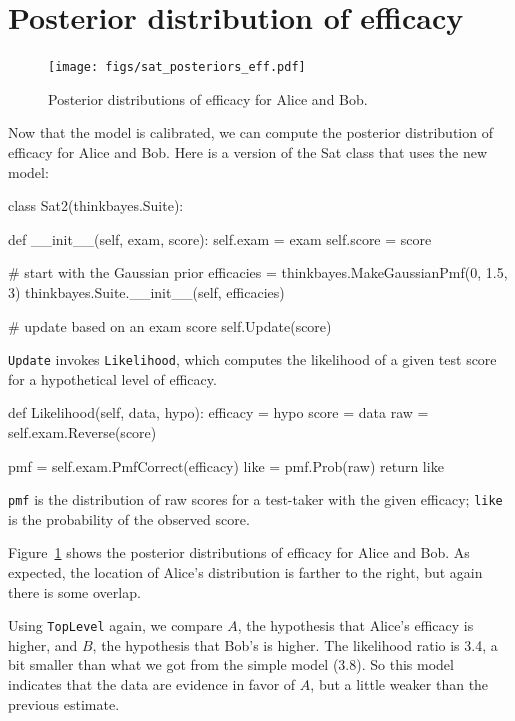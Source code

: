 \documentclass[12pt]{book}
\theoremstyle{exercise}
\newcommand{\py}[1]{{\tt #1}}%
\begin{document}
\section{Posterior distribution of efficacy}

\begin{figure}
\centerline{\texttt{[image: figs/sat\_posteriors\_eff.pdf]}}
\caption{Posterior distributions of efficacy for Alice and Bob.}
\label{fig.satposterior2}
\end{figure}

Now that the model is calibrated, we can compute the posterior
distribution of efficacy for Alice and Bob.  Here is a version of the
Sat class that uses the new model:

\begin{code}
class Sat2(thinkbayes.Suite):

    def __init__(self, exam, score):
        self.exam = exam
        self.score = score

        # start with the Gaussian prior
        efficacies = thinkbayes.MakeGaussianPmf(0, 1.5, 3)
        thinkbayes.Suite.__init__(self, efficacies)

        # update based on an exam score
        self.Update(score)
\end{code}

\verb"Update" invokes
\verb"Likelihood", which computes the likelihood of a given test score
for a hypothetical level of efficacy.

\begin{code}
    def Likelihood(self, data, hypo):
        efficacy = hypo
        score = data
        raw = self.exam.Reverse(score)

        pmf = self.exam.PmfCorrect(efficacy)
        like = pmf.Prob(raw)
        return like
\end{code}

\py{pmf} is the distribution of raw scores for a test-taker
with the given efficacy; \py{like} is the probability of
the observed score.

Figure~\ref{fig.satposterior2} shows the posterior distributions
of efficacy for Alice and Bob.  As expected, the location
of Alice's distribution is farther to the right, but again there
is some overlap.

Using \py{TopLevel} again, we compare $A$, the
hypothesis that Alice's efficacy is higher, and $B$, the
hypothesis that Bob's is higher.  The likelihood ratio is
3.4, a bit smaller than what we got from the simple model (3.8).
So this model indicates that the data are evidence in favor
of $A$, but a little weaker than the previous estimate.
\end{document}

